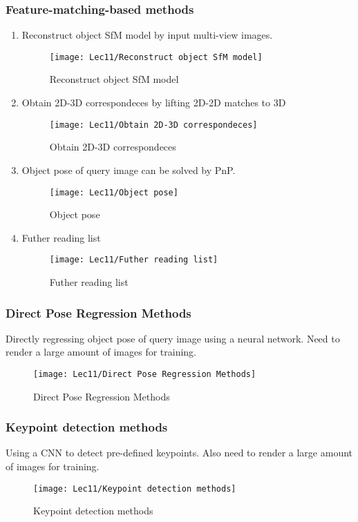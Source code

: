 \subsubsection{Feature-matching-based methods}
\begin{enumerate}
    \item Reconstruct object SfM model by input multi-view images. 
    \begin{figure}[H]
        \centering
        \texttt{[image: Lec11/Reconstruct object SfM model]}
        \caption{Reconstruct object SfM model}
    \end{figure}
    \item Obtain 2D-3D correspondeces by lifting 2D-2D matches to 3D
    \begin{figure}[H]
        \centering
        \texttt{[image: Lec11/Obtain 2D-3D correspondeces]}
        \caption{Obtain 2D-3D correspondeces}
    \end{figure}
    \item Object pose of query image can be solved by PnP.
    \begin{figure}[H]
        \centering
        \texttt{[image: Lec11/Object pose]}
        \caption{Object pose}
    \end{figure}
    \item Futher reading list
    \begin{figure}[H]
        \centering
        \texttt{[image: Lec11/Futher reading list]}
        \caption{Futher reading list}
    \end{figure}
\end{enumerate}

\subsubsection{Direct Pose Regression Methods}

Directly regressing object pose of query image using a neural network. Need to render a large amount of images for training.

\begin{figure}[H]
    \centering
    \texttt{[image: Lec11/Direct Pose Regression Methods]}
    \caption{Direct Pose Regression Methods}
\end{figure}

\subsubsection{Keypoint detection methods}
Using a CNN to detect pre-defined keypoints. Also need to render a large amount of images for training. 
\begin{figure}[H]
    \centering
    \texttt{[image: Lec11/Keypoint detection methods]}
    \caption{Keypoint detection methods}
\end{figure}

